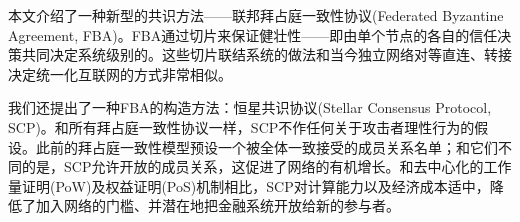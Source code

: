 \abstract{}
本文介绍了一种新型的共识方法——联邦拜占庭一致性协议(Federated Byzantine Agreement, FBA)。FBA通过{\quorum}切片来保证健壮性——即由单个节点的各自的信任决策共同决定系统级别的{\quorum}。这些切片联结系统的做法和当今独立网络对等直连、转接决定统一化互联网的方式非常相似。

我们还提出了一种FBA的构造方法：恒星共识协议(Stellar Consensus Protocol, SCP)。和所有拜占庭一致性协议一样，SCP不作任何关于攻击者理性行为的假设。此前的拜占庭一致性模型预设一个被全体一致接受的成员关系名单；和它们不同的是，SCP允许开放的成员关系，这促进了网络的有机增长。和去中心化的工作量证明(PoW)及权益证明(PoS)机制相比，SCP对计算能力以及经济成本适中，降低了加入网络的门槛、并潜在地把金融系统开放给新的参与者。
